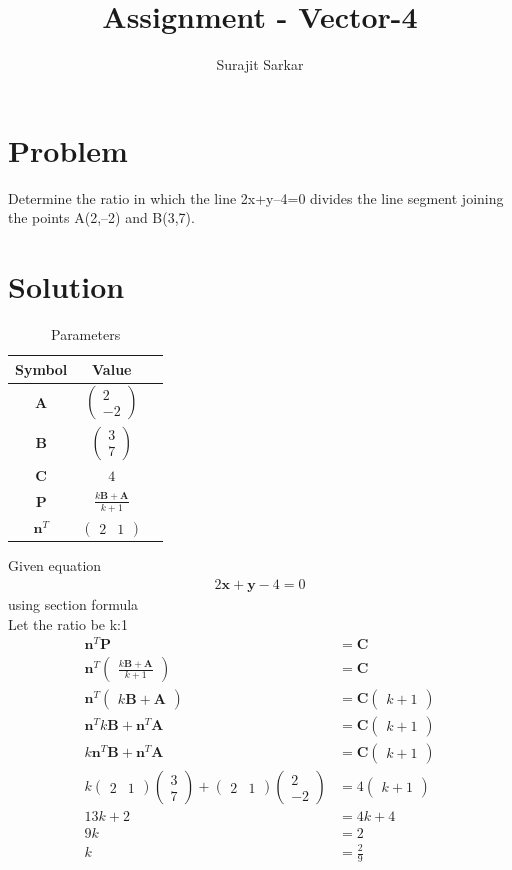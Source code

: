 \documentclass[journal,12pt,twocolumn]{IEEEtran}
\title{\mytitle}
\title{
Assignment - Vector-4
}
\author{Surajit Sarkar}
\newcommand{\myvec}[1]{\ensuremath{\begin{pmatrix}#1\end{pmatrix}}}
\let\vec\mathbf
\begin{document}
\maketitle
\tableofcontents
\bigskip
\section{\textbf{Problem}}
Determine the ratio in which the line 2x+y–4=0 divides the line segment joining the points A(2,–2) and B(3,7).
\section{\textbf{Solution}}
\begin{table}[h]
    \centering
    \begin{tabular}{|c|c|c|}
       \hline
       \textbf{Symbol}&\textbf{Value}  \\
       \hline
	    $\vec{A}$ & $\myvec{
		    2\\
		    -2}$
	    \\
        \hline
	    $\vec{B}$ & $\myvec{3\\7}$
 \\
        \hline
	    $\vec{C}$ & $4$
 \\
       \hline
            $\vec{P}$ & $\frac{k\vec{B+A}}{k+1}$\\
       \hline
       $\vec{n}^T$ & $\myvec{2&1}$\\
       \hline
    \end{tabular}
    \caption{Parameters}
    \label{tab:my_label}
\end{table}
Given equation
\begin{align}
    2\vec{x}+\vec{y}-4=0
\end{align}
using section formula\\Let the ratio be k:1
\begin{align}
    \vec{n}^T\vec{P}&=\vec{C}\\
    \vec{n}^T\myvec{\frac{k\vec{B+A}}{k+1}}&=\vec{C}\\
    \vec{n}^T\myvec{k\vec{B+A}}&=\vec{C}\myvec{k+1}\\
    \vec{n}^Tk\vec{B}+\vec{n}^T\vec{A}&=\vec{C}\myvec{k+1}\\
    k\vec{n}^T\vec{B}+\vec{n}^T\vec{A}&=\vec{C}\myvec{k+1}\\
    k\myvec{2&1}\myvec{3\\7}+\myvec{2&1}\myvec{2\\-2}&=4\myvec{k+1}\\
    13k+2&=4k+4\\
    9k&=2\\
    k&=\frac{2}{9}
\end{align}
\end{document}
